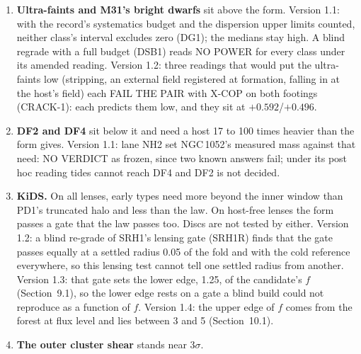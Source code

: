 \documentclass[10pt]{article}
\begin{document}
\begin{enumerate}
\item \textbf{Ultra-faints and M31's bright dwarfs} sit above the form. Version 1.1: with the record's systematics budget and the dispersion upper limits counted, neither class's interval excludes zero (DG1); the medians stay high. A blind regrade with a full budget (DSB1) reads NO POWER for every class under its amended reading. Version 1.2: three readings that would put the ultra-faints low (stripping, an external field registered at formation, falling in at the host's field) each FAIL THE PAIR with X-COP on both footings (CRACK-1): each predicts them low, and they sit at $+0.592$/$+0.496$.
\item \textbf{DF2 and DF4} sit below it and need a host 17 to 100 times heavier than the form gives. Version 1.1: lane NH2 set NGC\,1052's measured mass against that need: NO VERDICT as frozen, since two known answers fail; under its post hoc reading tides cannot reach DF4 and DF2 is not decided.
\item \textbf{KiDS.} On all lenses, early types need more beyond the inner window than PD1's truncated halo and less than the law. On host-free lenses the form passes a gate that the law passes too. Discs are not tested by either. Version 1.2: a blind re-grade of SRH1's lensing gate (SRH1R) finds that the gate passes equally at a settled radius 0.05 of the fold and with the cold reference everywhere, so this lensing test cannot tell one settled radius from another. Version 1.3: that gate sets the lower edge, 1.25, of the candidate's $f$ (Section~9.1), so the lower edge rests on a gate a blind build could not reproduce as a function of $f$. Version 1.4: the upper edge of $f$ comes from the forest at flux level and lies between 3 and 5 (Section~10.1).
\item \textbf{The outer cluster shear} stands near 3$\sigma$.

\end{enumerate}
\end{document}
